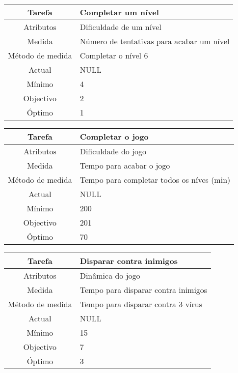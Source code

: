 \begin{center}
	\begin{tabular} {|c|p{10cm}|}
		\hline
		Tarefa & Completar um nível \\
		\hline
		Atributos & Dificuldade de um nível \\
		\hline
		Medida & Número de tentativas para acabar um nível \\
		\hline
		Método de medida & Completar o nível 6 \\
		\hline
		Actual & NULL \\
		Mínimo & 4 \\
		Objectivo & 2 \\
		Óptimo & 1 \\
		\hline
	\end{tabular}
\end{center}

\begin{center}
	\begin{tabular} {|c|p{10cm}|}
		\hline
		Tarefa & Completar o jogo \\
		\hline
		Atributos & Dificuldade do jogo \\
		\hline
		Medida & Tempo para acabar o jogo \\
		\hline
		Método de medida & Tempo para completar todos os níves (min) \\
		\hline
		Actual & NULL \\
		Mínimo & 200 \\
		Objectivo & 201 \\
		Óptimo & 70 \\
		\hline
	\end{tabular}
\end{center}

\begin{center}
	\begin{tabular} {|c|p{10cm}|}
		\hline
		Tarefa & Disparar contra inimigos \\
		\hline
		Atributos & Dinâmica do jogo \\
		\hline
		Medida & Tempo para disparar contra inimigos \\
		\hline
		Método de medida & Tempo para disparar contra 3 vírus \\
		\hline
		Actual & NULL \\
		Mínimo & 15 \\
		Objectivo & 7 \\
		Óptimo & 3 \\
		\hline
	\end{tabular}
\end{center}

